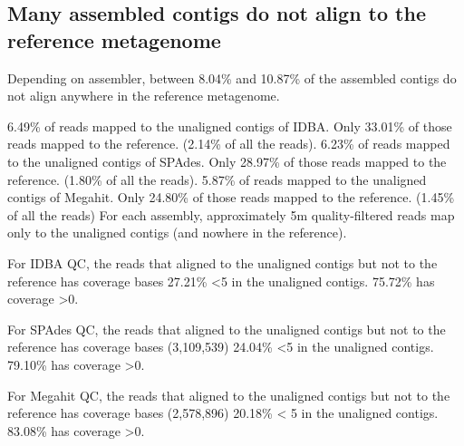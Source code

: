 \documentclass[10pt,a4paper,twocolumn]{article}
\begin{document}


\subsection*{Many assembled contigs do not align to the reference metagenome}
Depending on assembler, between 8.04\% and 10.87\% of the assembled
contigs do not align anywhere in the reference metagenome.

6.49\% of reads mapped to the unaligned contigs of IDBA. Only 33.01\%
of those reads mapped to the reference. (2.14\% of all the reads).
6.23\% of reads mapped to the unaligned contigs of SPAdes. Only
28.97\% of those reads mapped to the reference. (1.80\% of all the
reads).  5.87\% of reads mapped to the unaligned contigs of
Megahit. Only 24.80\% of those reads mapped to the reference. (1.45\%
of all the reads)
For
each assembly, approximately 5m quality-filtered reads map only to the
unaligned contigs (and nowhere in the reference).

 

For IDBA QC, the reads that aligned to the unaligned contigs but not
to the reference has coverage bases 27.21\% \textless 5 in the
unaligned contigs. 75.72\% has coverage \textgreater 0.

For SPAdes QC, the reads that aligned to the unaligned contigs but not
to the reference has coverage bases (3,109,539) 24.04\% \textless 5 in
the unaligned contigs. 79.10\% has coverage \textgreater 0.

For Megahit QC, the reads that aligned to the unaligned contigs but
not to the reference has coverage bases (2,578,896) 20.18\% \textless
5 in the unaligned contigs. 83.08\% has coverage \textgreater 0.

 
\end{document}
